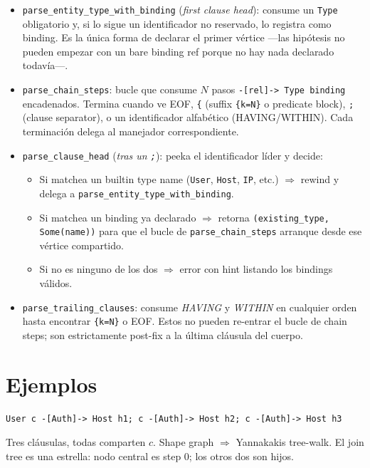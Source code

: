 \begin{itemize}
    \item \texttt{parse\_entity\_type\_with\_binding}
    (\emph{first clause head}): consume un \texttt{Type}
    obligatorio y, si lo sigue un identificador no reservado, lo
    registra como binding. Es la única forma de declarar el primer
    vértice ---las hipótesis no pueden empezar con un bare binding
    ref porque no hay nada declarado todavía---.

    \item \texttt{parse\_chain\_steps}: bucle que consume \(N\)
    pasos \texttt{-[rel]-> Type binding} encadenados. Termina cuando
    ve EOF, \texttt{\{} (suffix \texttt{\{k=N\}} o predicate block),
    \texttt{;} (clause separator), o un identificador alfabético
    (HAVING/WITHIN). Cada terminación delega al manejador
    correspondiente.

    \item \texttt{parse\_clause\_head} (\emph{tras un \texttt{;}}):
    peeka el identificador líder y decide:

    \begin{itemize}
        \item Si matchea un builtin type name (\texttt{User},
        \texttt{Host}, \texttt{IP}, etc.) $\Rightarrow$ rewind y
        delega a \texttt{parse\_entity\_type\_with\_binding}.
        \item Si matchea un binding ya declarado $\Rightarrow$
        retorna \texttt{(existing\_type, Some(name))} para que el
        bucle de \texttt{parse\_chain\_steps} arranque desde ese
        vértice compartido.
        \item Si no es ninguno de los dos $\Rightarrow$ error con
        hint listando los bindings válidos.
    \end{itemize}

    \item \texttt{parse\_trailing\_clauses}: consume \emph{HAVING}
    y \emph{WITHIN} en cualquier orden hasta encontrar
    \texttt{\{k=N\}} o EOF. Estos no pueden re-entrar el bucle de
    chain steps; son estrictamente post-fix a la última cláusula
    del cuerpo.
\end{itemize}

\section{Ejemplos}

\begin{ejemplo}
\begin{lstlisting}
User c -[Auth]-> Host h1; c -[Auth]-> Host h2; c -[Auth]-> Host h3
\end{lstlisting}

Tres cláusulas, todas comparten \(c\). Shape graph $\Rightarrow$
Yannakakis tree-walk. El join tree es una estrella: nodo central
es step 0; los otros dos son hijos.
\end{ejemplo}

